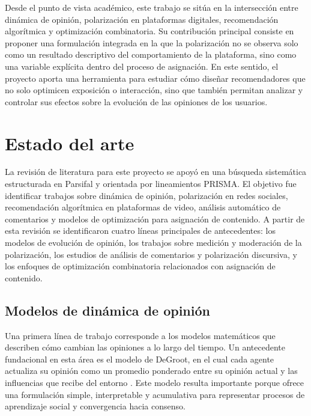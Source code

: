 \documentclass[10pt,letterpaper]{article}
\begin{document}
Desde el punto de vista acad\'emico, este trabajo se sit\'ua en la intersecci\'on entre din\'amica de opini\'on, polarizaci\'on en plataformas digitales, recomendaci\'on algor\'itmica y optimizaci\'on combinatoria. Su contribuci\'on principal consiste en proponer una formulaci\'on integrada en la que la polarizaci\'on no se observa solo como un resultado descriptivo del comportamiento de la plataforma, sino como una variable expl\'icita dentro del proceso de asignaci\'on. En este sentido, el proyecto aporta una herramienta para estudiar c\'omo dise\~nar recomendadores que no solo optimicen exposici\'on o interacci\'on, sino que tambi\'en permitan analizar y controlar sus efectos sobre la evoluci\'on de las opiniones de los usuarios.

\section{Estado del arte}

La revisi\'on de literatura para este proyecto se apoy\'o en una b\'usqueda sistem\'atica estructurada en Parsifal y orientada por lineamientos PRISMA. El objetivo fue identificar trabajos sobre din\'amica de opini\'on, polarizaci\'on en redes sociales, recomendaci\'on algor\'itmica en plataformas de video, an\'alisis autom\'atico de comentarios y modelos de optimizaci\'on para asignaci\'on de contenido. A partir de esta revisi\'on se identificaron cuatro l\'ineas principales de antecedentes: los modelos de evoluci\'on de opini\'on, los trabajos sobre medici\'on y moderaci\'on de la polarizaci\'on, los estudios de an\'alisis de comentarios y polarizaci\'on discursiva, y los enfoques de optimizaci\'on combinatoria relacionados con asignaci\'on de contenido.

\subsection{Modelos de din\'amica de opini\'on}

Una primera l\'inea de trabajo corresponde a los modelos matem\'aticos que describen c\'omo cambian las opiniones a lo largo del tiempo. Un antecedente fundacional en esta \'area es el modelo de DeGroot, en el cual cada agente actualiza su opini\'on como un promedio ponderado entre su opini\'on actual y las influencias que recibe del entorno \cite{degroot1974}. Este modelo resulta importante porque ofrece una formulaci\'on simple, interpretable y acumulativa para representar procesos de aprendizaje social y convergencia hacia consenso.
\end{document}
